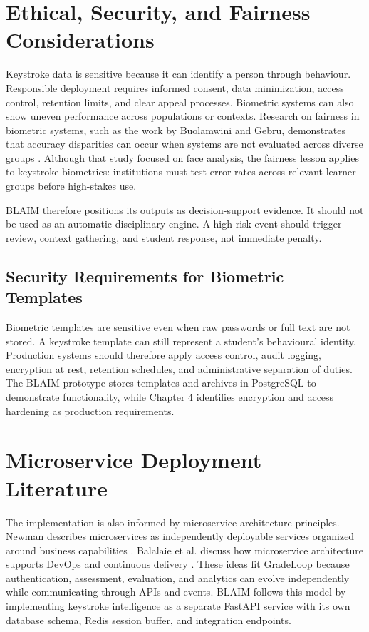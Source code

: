 \section{Ethical, Security, and Fairness Considerations}
\label{sec:lit-ethics}

Keystroke data is sensitive because it can identify a person through behaviour. Responsible deployment requires informed consent, data minimization, access control, retention limits, and clear appeal processes. Biometric systems can also show uneven performance across populations or contexts. Research on fairness in biometric systems, such as the work by Buolamwini and Gebru, demonstrates that accuracy disparities can occur when systems are not evaluated across diverse groups \cite{buolamwini2018gender}. Although that study focused on face analysis, the fairness lesson applies to keystroke biometrics: institutions must test error rates across relevant learner groups before high-stakes use.

BLAIM therefore positions its outputs as decision-support evidence. It should not be used as an automatic disciplinary engine. A high-risk event should trigger review, context gathering, and student response, not immediate penalty.

\subsection{Security Requirements for Biometric Templates}
\label{subsec:security-templates}

Biometric templates are sensitive even when raw passwords or full text are not stored. A keystroke template can still represent a student's behavioural identity. Production systems should therefore apply access control, audit logging, encryption at rest, retention schedules, and administrative separation of duties. The BLAIM prototype stores templates and archives in PostgreSQL to demonstrate functionality, while Chapter 4 identifies encryption and access hardening as production requirements.

\section{Microservice Deployment Literature}
\label{sec:microservice-lit}

The implementation is also informed by microservice architecture principles. Newman describes microservices as independently deployable services organized around business capabilities \cite{newman2015microservices}. Balalaie et al. discuss how microservice architecture supports DevOps and continuous delivery \cite{balalaie2016microservices}. These ideas fit GradeLoop because authentication, assessment, evaluation, and analytics can evolve independently while communicating through APIs and events. BLAIM follows this model by implementing keystroke intelligence as a separate FastAPI service with its own database schema, Redis session buffer, and integration endpoints.

